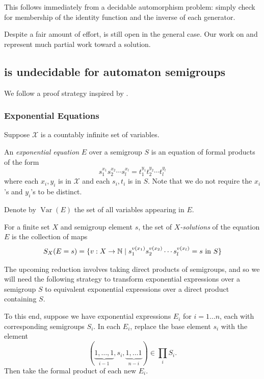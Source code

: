 \documentclass[11pt, titlepage]{article}
\begin{document}
This follows immediately from a decidable automorphism
 problem: simply check for membership of the
identity function and the inverse of each generator.

Despite a fair amount of effort,  is still open in
the general case. Our work on  and
 represent much partial work toward a solution.

\subsection{ is undecidable for automaton semigroups}
We follow a proof strategy inspired by \cite{Konig15:knapsack}.


\subsubsection{Exponential Equations}

Suppose $\mathcal{X}$ is a countably infinite set of variables.
\begin{definition}
  An \emph{exponential equation} $E$ over a semigroup $S$ is an equation of 
  formal products of the form
  \[
    s_1^{x_1} s_2^{x_2}\cdots s_l^{x_l}
    = t_1^{y_1} t_2^{y_2}\cdots t_l^{y_l}
  \]
  where each $x_i, y_i$ is in $\mathcal{X}$ and each $s_i, t_i$ is in $S$. Note
  that we do not require the $x_i$'s and $y_i$'s to be distinct.
\end{definition}

Denote by $\operatorname{Var}(E)$ the set of all variables appearing
in $E$.
\begin{definition}
  For a finite set $X$ and semigroup element $s$, the set of
  \emph{$X$-solutions} of the equation $E$ is the collection of maps
  \[
    S_X(E = s) = \{ v : X \rightarrow \mathbb{N} \mid
    s_1^{v(x_1)} s_2^{v(x_2)}\cdots s_l^{v(x_l)} = s
    \text{ \normalfont in } S
    \}
  \]
\end{definition}

The upcoming reduction involves taking direct products of semigroups,
and so we will need the following strategy to transform exponential
expressions over a semigroup $S$ to equivalent exponential expressions
over a direct product containing $S$.

To this end, suppose we have exponential expressions $E_i$ for
$i = 1\ldots n$, each with corresponding semigroups $S_i$. In each
$E_i$, replace the base element $s_i$ with the element
\[
  (\underbrace{1, \ldots, 1}_\text{$i-1$}, s_i,
   \underbrace{1, \ldots 1}_\text{$n-i$}) \in \prod_i S_i.
\]
Then take the formal product of each new $E_i$.
\end{document}
